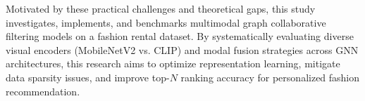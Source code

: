 Motivated by these practical challenges and theoretical gaps, this study investigates, implements, and benchmarks multimodal graph collaborative filtering models on a fashion rental dataset. By systematically evaluating diverse visual encoders (MobileNetV2 vs. CLIP) and modal fusion strategies across GNN architectures, this research aims to optimize representation learning, mitigate data sparsity issues, and improve top-$N$ ranking accuracy for personalized fashion recommendation.
